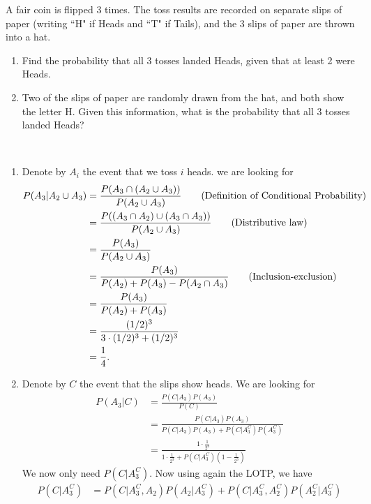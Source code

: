 

\setcounter{theorem}{12}
\begin{exercise}[BH.2.21]
A fair coin is flipped 3 times. The toss results are recorded on separate slips of paper (writing ``H" if Heads and ``T" if Tails), and the 3 slips of paper are thrown into a hat.
	\begin{enumerate}
		\item Find the probability that all 3 tosses landed Heads, given that at least 2 were Heads.
		\item Two of the slips of paper are randomly drawn from the hat, and both show the letter H. Given this information, what is the probability that all 3 tosses landed Heads?
	\end{enumerate}
\begin{solution}~
	\begin{enumerate}
		\item Denote by $A_i$ the event that we toss $i$ heads. we are looking for
		\begin{align*}
			P(A_{3}|A_{2}\cup A_{3})& = \frac{P(A_{3}\cap (A_{2}\cup A_{3}))}{P(A_{2}\cup A_{3})}\tag*{(\text{Definition of Conditional Probability})}\\
			& = \frac{P((A_{3}\cap A_{2})\cup(A_{3}\cap A_{3}))}{P(A_{2}\cup A_{3})}\tag*{(\text{Distributive law})}\\
			& = \frac{P(A_{3})}{P(A_{2}\cup A_{3})}\\
			& = \frac{P(A_{3})}{P(A_{2})+P(A_{3})-P(A_{2}\cap A_{3})}\tag*{(\text{Inclusion-exclusion})}\\
			& = \frac{P(A_{3})}{P(A_{2})+P(A_{3})}\\
			& =\frac{(1/2)^3}{3\cdot (1/2)^3 + (1/2)^3} \\
			& = \frac{1}{4}.
		\end{align*}
		\item Denote by $C$ the event that the slips show heads. We are looking for 
		\begin{align*}
			P(A_{3}|C) &= \frac{P(C|A_{3})P(A_{3})}{P(C)}\\
			&=\frac{P(C|A_{3})P(A_{3})}{P(C|A_{3})P(A_{3}) + P(C|A_{3}^{C})P(A_{3}^{C})}\\ 
			& = \frac{1\cdot \frac{1}{2^3}}{1\cdot \frac{1}{2^3} + P(C|A_{3}^{C})(1-\frac{1}{2^3})}
		\end{align*}
		We now only need $P(C|A_{3}^C)$. Now using again the LOTP, we have
		\begin{align*}
			P(C|A_{3}^{C}) &= P(C|A_{3}^{C},A_{2})P(A_{2}|A_{3}^{C}) + P(C|A_{3}^{C},A_{2}^{C})P(A_{2}^{C}|A_{3}^{C})\\

\end{align*}
\end{enumerate}
\end{solution}
\end{exercise}
